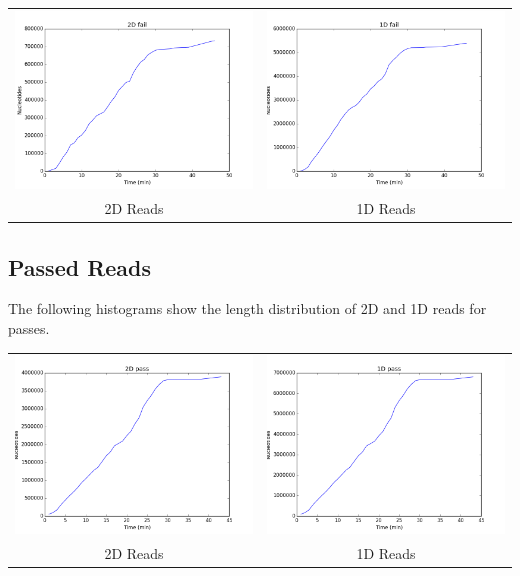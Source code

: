 \documentclass[11pt]{article}
\begin{document}
        
        \begin{tabular}{cc}
          \includegraphics[width=.48\textwidth]{failcum2D}
          &
          \includegraphics[width=.48\textwidth]{failcum1D}
          \\
          2D Reads
          &
          1D Reads
        \end{tabular}

\subsection*{Passed Reads}

        The following histograms show the length distribution of 2D and 1D reads for passes.

        
        \begin{tabular}{cc}
          \includegraphics[width=.48\textwidth]{passcum2D}
          &
          \includegraphics[width=.48\textwidth]{passcum1D}
          \\
          2D Reads
          &
          1D Reads
        \end{tabular}
\end{document}
